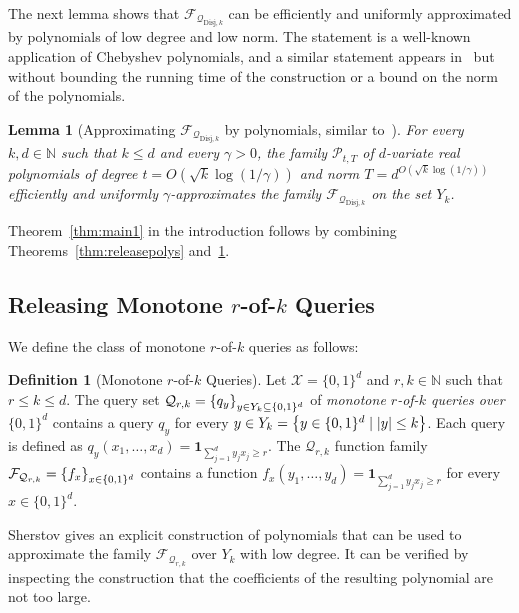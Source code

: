 \documentclass[11pt]{article}
\newcommand\N{\mathbb{N}}
\newcommand\cF{\mathcal{F}}
\newcommand\cP{\mathcal{P}}
\newcommand\cQ{\mathcal{Q}}
\newcommand\cX{\mathcal{X}}
\newcommand\bits{\{0,1\}}
\newtheorem{lemma}[theorem]{Lemma}
\theoremstyle{definition}
\newtheorem{definition}[theorem]{Definition}
\begin{document}
The next lemma shows that $\cF_{\cQ_{\mathrm{Disj}, k}}$ can be efficiently and uniformly approximated by polynomials of low degree and low norm.  The statement is a well-known application of Chebyshev polynomials, and a similar statement appears in~\cite{HardtRoSe12} but without bounding the running time of the construction or a bound on the norm of the polynomials. 
\begin{lemma}[Approximating $\cF_{\cQ_{\mathrm{Disj}, k}}$ by polynomials, similar to~\cite{HardtRoSe12}] \label{thm:approxdisj}
For every $k,d \in \N$ such that $k \leq d$ and every $\gamma > 0$, the family $\cP_{t, T}$ of $d$-variate real polynomials of degree $t = O(\sqrt{k} \log(1/\gamma))$ and norm $T = d^{O(\sqrt{k} \log(1/\gamma))}$ efficiently and uniformly $\gamma$-approximates the family $\cF_{\cQ_{\mathrm{Disj}, k}}$ on the set $Y_k$.
\end{lemma}
\fi

Theorem~\ref{thm:main1} in the introduction follows by combining Theorems~\ref{thm:releasepolys} and~\ref{thm:approxdisj}.


\subsection{Releasing Monotone $r$-of-$k$ Queries}
We define the class of monotone $r$-of-$k$ queries as follows:

\begin{definition}[Monotone $r$-of-$k$ Queries] Let $\cX = \bits^d$ and $r,k \in \N$ such that $r \leq k \leq d$.
The query set $\cQ_{r, k} = \set{q_y}_{y \in Y_k \subseteq \bits^d}$ of \emph{monotone $r$-of-$k$ queries over $\bits^d$} contains a query $q_y$ for every $y \in Y_k = \set{y \in \bits^d \mid |y| \leq k}$.  Each query is defined as $q_y(x_1, \dots, x_d) = \mathbf{1}_{\sum_{j=1}^{d} y_j x_j \geq r}$.
The $\cQ_{r, k}$ function family $\cF_{\cQ_{r, k}} = \set{f_x}_{x \in \bits^d}$ contains a function
$f_x(y_1, \dots, y_d) = \mathbf{1}_{\sum_{j=1}^{d} y_j x_j \geq r}$
for every $x \in \bits^d$.
\end{definition}

\ifnum{}
Sherstov \cite[Lemma 3.11]{Sherstov09} gives an explicit construction of polynomials that can be used to approximate the family $\cF_{\cQ_{r,k}}$ over $Y_k$ with low degree.
It can be verified by inspecting the construction that the coefficients of the resulting polynomial are not too large.
\end{document}
